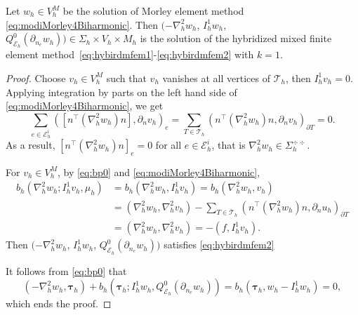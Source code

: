 \begin{theorem}
Let $w_h\in V_h^M$ be the solution of Morley element method \eqref{eq:modiMorley4Biharmonic}. Then $(-\nabla_h^2w_h$, $I_h^1w_h$, $Q_{\mathcal E_h}^0(\partial_{n_e}w_h))\in\Sigma_h\times V_h\times M_h$ is the solution of the hybridized mixed finite element method~\eqref{eq:hybirdmfem1}-\eqref{eq:hybirdmfem2} with $k=1$.
\end{theorem}
\begin{proof}
Choose $v_h\in V_h^M$ such that $v_h$ vanishes at all vertices of $\mathcal T_h$, then $I_h^1v_h=0$.
Applying integration by parts on the left hand side of \eqref{eq:modiMorley4Biharmonic}, we get
$$
\sum_{e\in\mathcal E_h^i}([n^{\intercal}(\nabla_h^2w_h)n],\partial_nv_h)_e=\sum_{T\in\mathcal T_h}(n^{\intercal}(\nabla_h^2w_h)n,\partial_nv_h)_{\partial T}=0.
$$
As a result, $[n^{\intercal}(\nabla_h^2w_h)n]_e=0$ for all $e\in\mathcal E_h^i$, that is $\nabla_h^2w_h\in \Sigma_h^{\div\div}$.

For $v_h\in V_h^M$, by \eqref{eq:bp0} and \eqref{eq:modiMorley4Biharmonic},
\begin{align*}  
b_h(\nabla_h^2w_h; I_h^1v_h,\mu_h)&=b_h(\nabla_h^2w_h, I_h^1v_h)=b_h(\nabla_h^2w_h, v_h) \\
&=(\nabla_h^2w_h, \nabla_h^2v_h) - \sum_{T\in \mathcal{T}_{h}}(n^{\intercal}(\nabla_h^2w_h)n, \partial_{n}u_h)_{\partial T} \\
&=(\nabla_h^2w_h, \nabla_h^2v_h)=-(f, I_h^1v_h).
\end{align*}
Then $(-\nabla_h^2w_h$, $I_h^1w_h$, $Q_{\mathcal E_h}^0(\partial_{n_e}w_h))$ satisfies \eqref{eq:hybirdmfem2}

It follows from \eqref{eq:bp0} that
$$(-\nabla_h^2w_h, \boldsymbol\tau_h)+ b_h(\boldsymbol\tau_h; I_h^1w_h,Q_{\mathcal E_h}^0(\partial_{n_e}w_h)) = b_h(\boldsymbol\tau_h, w_h-I_h^1w_h)=0,
$$
which ends the proof.
\end{proof}

